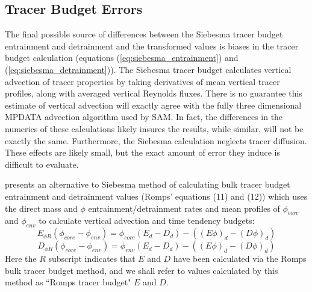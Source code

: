 \documentclass[12pt]{article}
\begin{document}

\subsection{Tracer Budget Errors}

The final possible source of differences between the Siebesma tracer 
budget entrainment and detrainment and the transformed values is biases
in the tracer budget calculation (equations (\ref{eq:siebesma_entrainment})
and (\ref{eq:siebesma_detrainment})).  The Siebesma tracer budget calculates 
vertical advection of tracer properties by taking derivatives of mean 
vertical tracer profiles, along with averaged vertical Reynolds fluxes.  
There is no guarantee this estimate of vertical advection will exactly 
agree with the fully three dimensional MPDATA advection algorithm used by 
SAM.  In fact, the differences in the numerics of these calculations 
likely insures the results, while similar, will not be exactly the 
same.  Furthermore, the Siebesma calculation neglects tracer diffusion.  
These effects are likely small, but the exact amount of error they 
induce is difficult to evaluate.

\cite{Romps2010} presents an alternative to Siebesma method of calculating 
bulk tracer budget entrainment and detrainment values (Romps' equations (11) 
and (12)) which uses the direct mass and $\phi$ entrainment/detrainment rates 
and mean profiles of $\phi_{core}$ and $\phi_{env}$ to calculate vertical
advection and time tendency budgets:
\begin{equation}
  \label{eq:romps_bulk_entrainment}
    E_{\phi R}(\phi_{core} - \phi_{env}) = \phi_{core}(E_d-D_d) - ((E\phi)_d - (D\phi)_d)
\end{equation}
\begin{equation}
  \label{eq:romps_bulk_detrainment}
    D_{\phi R}(\phi_{core} - \phi_{env}) = \phi_{env}(E_d-D_d) - ((E\phi)_d - (D\phi)_d)
\end{equation}
Here the $R$ subscript indicates that $E$ and $D$ have been calculated via 
the Romps bulk tracer budget method, and we shall refer to values calculated 
by this method as ``Romps tracer budget" $E$ and $D$.
\end{document}
